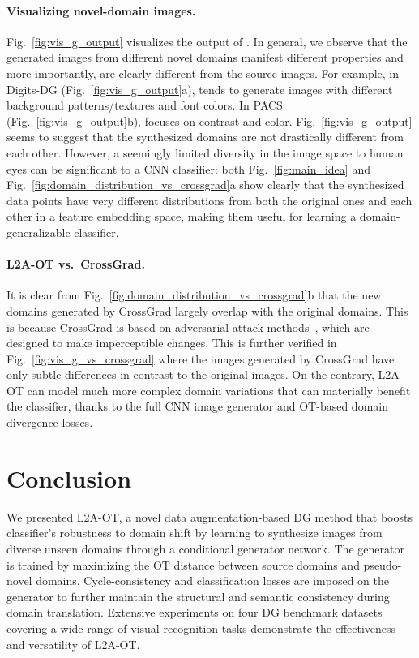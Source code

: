 \documentclass[runningheads]{llncs}
\begin{document}
\paragraph{Visualizing novel-domain images.}
Fig.~\ref{fig:vis_g_output} visualizes the output of . In general, we observe that the generated images from different novel domains manifest different properties and more importantly, are clearly different from the source images. For example, in Digits-DG (Fig.~\ref{fig:vis_g_output}a),  tends to generate images with different background patterns/textures and font colors. In PACS (Fig.~\ref{fig:vis_g_output}b),  focuses on contrast and color. Fig.~\ref{fig:vis_g_output} seems to suggest that the synthesized domains are not drastically different from each other. However,  a seemingly limited
diversity in the image space to human eyes can be significant
to a CNN classifier: both Fig.~\ref{fig:main_idea} and Fig.~\ref{fig:domain_distribution_vs_crossgrad}a show clearly that the synthesized
data points have very different distributions from both
the original ones and each other in a feature  embedding space, making them useful for
learning a domain-generalizable classifier.

\paragraph{L2A-OT vs.~CrossGrad.}
It is clear from Fig.~\ref{fig:domain_distribution_vs_crossgrad}b that the new domains generated by CrossGrad largely overlap with the original domains. This is because CrossGrad is based on adversarial attack methods~\cite{goodfellow2015explaining}, which are designed to make imperceptible changes. This is further verified in Fig.~\ref{fig:vis_g_vs_crossgrad} where the images generated by CrossGrad have only subtle differences in contrast to the original images. On the contrary, L2A-OT can model much more complex domain variations that can materially benefit the classifier, thanks to the full CNN image generator and OT-based domain divergence losses.

\section{Conclusion} \label{sec:conclusion}
We presented L2A-OT, a novel data augmentation-based DG method that boosts classifier's robustness to domain shift by learning to synthesize images from diverse unseen domains through a conditional generator network. The generator is trained by maximizing the OT distance between source domains and pseudo-novel domains. Cycle-consistency and classification losses are imposed on the generator to further maintain the structural and semantic consistency during domain translation. Extensive experiments on four DG benchmark datasets covering a wide range of visual recognition tasks demonstrate the effectiveness and versatility of L2A-OT.




\end{document}

